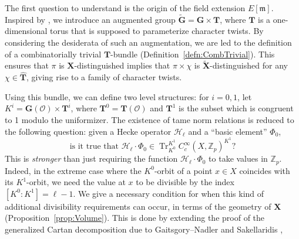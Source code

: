 \documentclass{amsart}
\theoremstyle{definition}
\theoremstyle{remark}
\newcommand{\1}{\mathbf{1}}
\newcommand{\m}{\mathfrak{m}}
\newcommand{\mb}[1]{\mathbf{#1}}
\newcommand{\Or}{\mathcal{O}}
\newcommand{\sh}[1]{\mathcal{#1}}
\newcommand{\Z}{\mathbb{Z}}
\DeclareMathOperator{\Tr}{Tr}
\theoremstyle{definition}
\newcommand{\bG}{\mathbf{G}}
\begin{document}
The first question to understand is the origin of the field extension $E[\m]$. Inspired by \cite{LoefflerSpherical,GrahamShah}, we introduce an augmented group $\widetilde{\bG}=\mb{G}\times\mb{T}$, where $\mb{T}$ is a one-dimensional torus that is supposed to parameterize character twists. By considering the desiderata of such an augmentation, we are led to the definition of a combinatorially trivial $\mb{T}$-bundle (Definition~\ref{defn:CombTrivial}). This ensures that $\pi$ is $\mb{X}$-distinguished implies that $\pi\times\chi$ is $\widetilde{\mb{X}}$-distinguished for any $\chi\in\hat{\mb{T}}$, giving rise to a family of character twists.

Using this bundle, we can define two level structures: for $i=0,1$, let $K^i=\bG(\Or)\times\mb{T}^i$, where $\mb{T}^0=\mb{T}(\Or)$ and $\mb{T}^1$ is the subset which is congruent to 1 modulo the uniformizer. The existence of tame norm relations is reduced to the following question: given a Hecke operator $\sh{H}_\ell$ and a ``basic element'' $\Phi_0$,
\begin{equation}\label{eqn:???}
    \text{is it true that }\sh{H}_\ell\cdot\Phi_0\in \Tr_{K^0}^{K^1}C_c^\infty(X,\Z_p)^{K^1}?\tag{\textdagger}
\end{equation}
This is \emph{stronger} than just requiring the function $\sh{H}_\ell\cdot\Phi_0$ to take values in $\Z_p$. Indeed, in the extreme case where the $K^0$-orbit of a point $x\in X$ coincides with its $K^1$-orbit, we need the value at $x$ to be divisible by the index $[K^0:K^1]=\ell-1$. We give a necessary condition for when this kind of additional divisibility requirements can occur, in terms of the geometry of $\mb{X}$ (Proposition~\ref{prop:Volume}). This is done by extending the proof of the generalized Cartan decomposition due to Gaitsgory--Nadler \cite[Theorem 8.2.9]{GN-Dual} and Sakellaridis \cite[Theorem 2.3.8]{SakANT}, 
\end{document}
